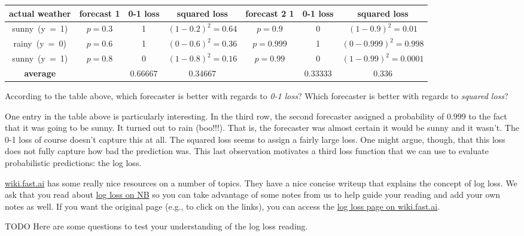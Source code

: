 \documentclass[assignment03_Solutions]{subfiles}
\begin{document}
\begin{table*}
\centering
\small
\begin{tabular}{c | c | c | c | c | c | c}
\hline
actual weather & forecast 1 & 0-1 loss & squared loss & forecast 2 1 & 0-1 loss & squared loss \\
\hline
\mbox{sunny (y = 1)} & $p = 0.3$ & 1 & $(1-0.2)^2 = 0.64$ & $p = 0.9$ & 0 & $(1 - 0.9)^2 = 0.01$\\
\mbox{rainy (y = 0)} & $p = 0.6$  & 1 & $(0-0.6)^2 = 0.36$ & $p = 0.999$ & 1 & $(0 - 0.999)^2 = 0.998$ \\ 
\mbox{sunny (y = 1)} & $p = 0.8$ & 0 & $(1-0.8)^2 = 0.16$ & $p = 0.99$ & 0 & $(1 - 0.99)^2 = 0.0001$\\
\hline
\textbf{average} & & $0.66667$ & $0.34667$ & & 0.33333 & 0.336
\end{tabular}
\end{table*}

\normalsize %

\begin{understandingcheck}
According to the table above, which forecaster is better with regards to \emph{0-1 loss}?  Which forecaster is better with regards to \emph{squared loss}?
\end{understandingcheck}

One entry in the table above is particularly interesting.  In the third row, the second forecaster assigned a probability of $0.999$ to the fact that it was going to be sunny.  It turned out to rain (boo!!!).  That is, the forecaster was almost certain it would be sunny and it wasn't.  The 0-1 loss of course doesn't capture this at all.  The squared loss seems to assign a fairly large loss.  One might argue, though, that this loss does not fully capture how bad the prediction was.  This last observation motivates a third loss function that we can use to evaluate probabilistic predictions: the log loss.

\begin{externalresources}
\url{wiki.fast.ai} has some really nice resources on a number of topics.  They have a nice concise writeup that explains the concept of log loss.  We ask that you read about \href{http://nb.mit.edu/f/55213}{log loss on NB} so you can take advantage of some notes from us to help guide your reading and add your own notes as well.  If you want the original page (e.g., to click on the links), you can access the \href{http://wiki.fast.ai/index.php/Log_Loss}{log loss page on wiki.fast.ai}.
\begin{exercise}
TODO Here are some questions to test your understanding of the log loss reading.
\end{exercise}
\end{externalresources}
\end{document}
